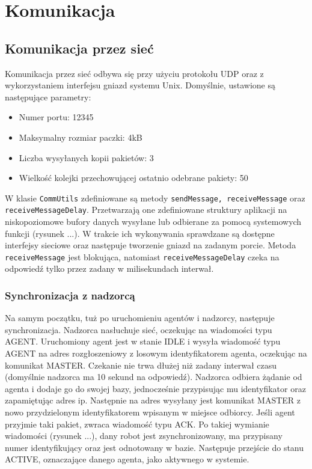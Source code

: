 \chapter{Komunikacja}
\label{ch:komunikacja}

\section{Komunikacja przez sieć}

Komunikacja przez sieć odbywa się przy użyciu protokołu UDP oraz z wykorzystaniem interfejsu gniazd systemu Unix. Domyślnie, ustawione są następujące parametry:
\begin{itemize}
    \item Numer portu: 12345
    \item Maksymalny rozmiar paczki: 4kB
    \item Liczba wysyłanych kopii pakietów: 3
    \item Wielkość kolejki przechowującej ostatnio odebrane pakiety: 50
\end{itemize}

W klasie {\tt CommUtils} zdefiniowane są metody {\tt sendMessage, receiveMessage} oraz {\tt receiveMessageDelay}. Przetwarzają one zdefiniowane struktury aplikacji na niskopoziomowe bufory danych wysyłane lub odbierane za pomocą systemowych funkcji (rysunek ...). W trakcie ich wykonywania sprawdzane są dostępne interfejsy sieciowe oraz następuje tworzenie gniazd na zadanym porcie. Metoda {\tt receiveMessage} jest blokująca, natomiast {\tt receiveMessageDelay} czeka na odpowiedź tylko przez zadany w milisekundach interwał.


\subsection{Synchronizacja z nadzorcą}

Na samym początku, tuż po uruchomieniu agentów i nadzorcy, następuje synchronizacja. Nadzorca nasłuchuje sieć, oczekując na wiadomości typu AGENT. Uruchomiony agent jest w stanie IDLE i wysyła wiadomość typu AGENT na adres rozgłoszeniowy z losowym identyfikatorem agenta, oczekując na komunikat MASTER. Czekanie nie trwa dłużej niż zadany interwał czasu (domyślnie nadzorca ma 10 sekund na odpowiedź). Nadzorca odbiera żądanie od agenta i dodaje go do swojej bazy, jednocześnie przypisując mu identyfikator oraz zapamiętując adres ip. Następnie na adres wysyłany jest komunikat MASTER z nowo przydzielonym identyfikatorem wpisanym w miejsce odbiorcy. Jeśli agent przyjmie taki pakiet, zwraca wiadomość typu ACK. Po takiej wymianie wiadomości (rysunek ...), dany robot jest zsynchronizowany, ma przypisany numer identyfikujący oraz jest odnotowany w bazie. Następuje przejście do stanu ACTIVE, oznaczające danego agenta, jako aktywnego w systemie.

